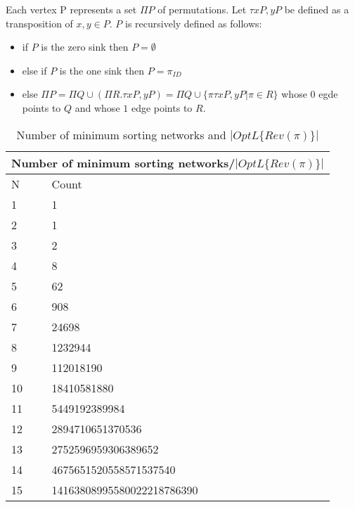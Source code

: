 Each vertex P represents a set $\Pi P$ of permutations. Let $\tau xP, yP$ be defined as a transposition 
of $x,y \in P$. $P$ is recursively defined as follows:
\begin{itemize}
    \item if $P$ is the zero sink then $P=\emptyset$
    \item else if $P$ is the one sink then  $P=\pi_{ID}$
    \item else $\Pi P = \Pi Q \cup (\Pi R . \tau xP,yP)= \Pi Q \cup \{\pi \tau xP, yP | \pi \in R\}$ whose $0$ egde points to $Q$ and whose $1$ edge points to $R$.
\end{itemize}
\pagebreak



\begin{table}
    \begin{center}

    \begin{tabular}{|p{2cm}||p{8cm}|}
        \hline
        \multicolumn{2}{|c|}{Number of minimum sorting networks/$|OptL\{Rev(\pi)\}|$}\\
        \hline
        N & Count \\ 
        \hline 
        1 & 1 \\
        \hline 
        2 & 1 \\
        \hline 
        3 & 2 \\
        \hline 
        4 & 8 \\
        \hline 
        5 & 62 \\
        \hline 
        6 & 908 \\
        \hline 
        7 & 24698 \\
        \hline 
        8 & 1232944 \\
        \hline 
        9 & 112018190 \\
        \hline 
        10 & 18410581880 \\
        \hline 
        11 & 5449192389984 \\ 
        \hline 
        12 & 2894710651370536 \\
        \hline 
        13 & 2752596959306389652 \\
        \hline 
        14 & 4675651520558571537540 \\
        \hline 
        15 & 14163808995580022218786390 \\
        \hline 
    \end{tabular}
    \end{center}
    \caption{Number of minimum sorting networks and $|OptL\{Rev(\pi)\}|$}
    \label{Tab:IntSeq1}
\end{table}\par